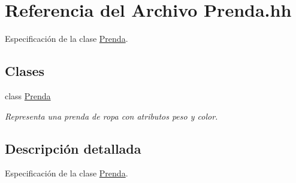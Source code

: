 \hypertarget{_prenda_8hh}{}\section{Referencia del Archivo Prenda.\+hh}
\label{_prenda_8hh}


Especificación de la clase \mbox{\hyperlink{class_prenda}{Prenda}}.  


\subsection*{Clases}
\begin{DoxyCompactItemize}
\item 
class \mbox{\hyperlink{class_prenda}{Prenda}}
\begin{DoxyCompactList}\small\item\em Representa una prenda de ropa con atributos peso y color. \end{DoxyCompactList}\end{DoxyCompactItemize}


\subsection{Descripción detallada}
Especificación de la clase \mbox{\hyperlink{class_prenda}{Prenda}}. 

